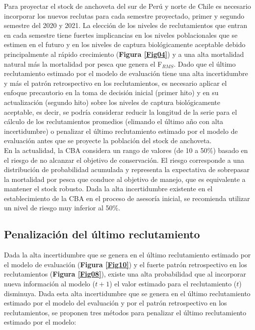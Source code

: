 \documentclass[letter,11pt]{article}
\begin{document}
Para proyectar el stock de anchoveta del sur de Per\'u y norte de Chile es
necesario incorporar los nuevos reclutas para cada semestre proyectado,
primer y segundo semestre del 2020 y 2021. La elecci\'on de los niveles de
reclutamientos que entran en cada semestre tiene fuertes implicancias en
los niveles poblacionales que se estimen en el futuro y en los niveles
de captura biol\'ogicamente aceptable debido principalmente al r\'apido
crecimiento (\textbf{Figura \ref{Fig04}}) y a una alta mortalidad natural
m\'as la mortalidad por pesca que genera el F$_{RMS}$. Dado que el
\'ultimo reclutamiento estimado por el modelo de evaluaci\'on tiene una alta
incertidumbre y m\'as el patr\'on retrospectivo en los reclutamientos, es
necesario aplicar el enfoque precautorio en la toma de decisi\'on inicial
(primer hito) y en su actualizaci\'on (segundo hito) sobre los niveles de
captura biol\'ogicamente aceptable, es decir, se podr\'ia considerar reducir
la longitud de la serie para el c\'alculo de los reclutamientos promedios
(elimando el \'ultimo año con alta incertidumbre) o penalizar el \'ultimo
reclutamiento estimado por el modelo de evaluaci\'on antes que se
proyecte la poblaci\'on del stock de anchoveta.\\


En la actualidad, la CBA considera un rango de valores (de 10 a 50\%)
basado en el riesgo de no alcanzar el objetivo de conservaci\'on. El
riesgo corresponde a una distribuci\'on de probabilidad acumulada y
representa la expectativa de sobrepasar la mortalidad por pesca que
conduce al objetivo de manejo, que es equivalente a mantener el stock
robusto. Dada la alta incertidumbre existente en el establecimiento de
la CBA en el proceso de asesor\'ia inicial, se recomienda utilizar un
nivel de riesgo muy inferior al 50\%.\\



\subsection{Penalizaci\'on del \'ultimo reclutamiento}


Dada la alta incertidumbre que se genera en el \'ultimo reclutamiento
estimado por el modelo de evaluaci\'on (\textbf{Figura \ref{Fig10}}) y
el fuerte patr\'on retrospectivo en los reclutamientos (\textbf{Figura 
\ref{Fig08}}), existe una alta probabilidad que al
incorporar nueva informaci\'on al modelo ($t+1$) el valor estimado para el 
reclutamiento ($t$) disminuya. Dada esta alta incertidumbre que se genera 
en el \'ultimo reclutamiento estimado por el modelo del evaluaci\'on y 
por el patr\'on retrospectivo en los reclutamientos, se proponen tres m\'etodos
para penalizar el \'ultimo reclutamiento estimado por el modelo:
\end{document}
